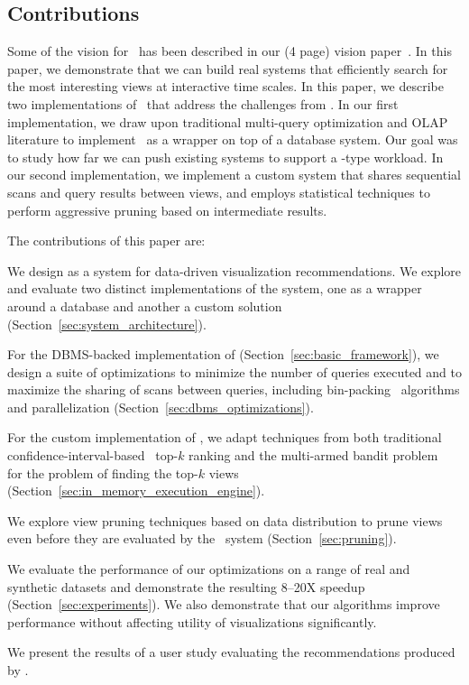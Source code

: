 \subsection*{Contributions}
Some of the vision for \SeeDB\ has been described in our (4 page) vision paper~\cite{DBLP:conf/vldb/Parameswaran2013}.
In this paper, we demonstrate that we can build real systems that efficiently search for the most
interesting views at interactive time scales.
In this paper, we describe two implementations of \SeeDB\ that address the challenges from \cite{DBLP:conf/vldb/Parameswaran2013}.
In our first implementation, we draw upon traditional multi-query optimization and OLAP literature to implement \SeeDB\ 
as a wrapper on top of a database system. Our goal was to study how far we can push existing systems to support a
\SeeDB-type workload.
In our second implementation, we implement a custom system that  shares sequential scans and query results between views, and 
employs statistical techniques to perform aggressive pruning based on intermediate results.

The contributions of this paper are:
\begin{denselist}
  \item We design \SeeDB as a system for data-driven visualization recommendations.
  We explore and evaluate two distinct implementations of the system, one as a
  wrapper around a database and another a custom solution (Section~\ref{sec:system_architecture}).
  \item For the DBMS-backed implementation of \SeeDB (Section~\ref{sec:basic_framework}), we
  design a suite of optimizations to minimize the number of queries executed and to
  maximize the sharing of scans between queries, 
  including bin-packing~\cite{garey} algorithms and parallelization
  (Section~\ref{sec:dbms_optimizations}).
  \item For the custom implementation of \SeeDB,  we adapt techniques 
  from both traditional confidence-interval-based~\cite{hoeffding1963probability} top-$k$ ranking and the
   multi-armed bandit problem~\cite{bandits} 
   for the problem of finding the top-$k$ views (Section~\ref{sec:in_memory_execution_engine}).
  \item We explore view pruning techniques based on data distribution
  to prune views even before they are evaluated by the \SeeDB\ system 
  (Section~\ref{sec:pruning}).
  \item We evaluate the performance of our optimizations on a range of
  real and synthetic datasets and demonstrate the resulting 8--20X speedup 
  (Section~\ref{sec:experiments}). We also demonstrate that our algorithms
  improve performance without affecting utility of visualizations significantly.
  \item We present the results of a user study evaluating the recommendations produced by \SeeDB.
\end{denselist}




